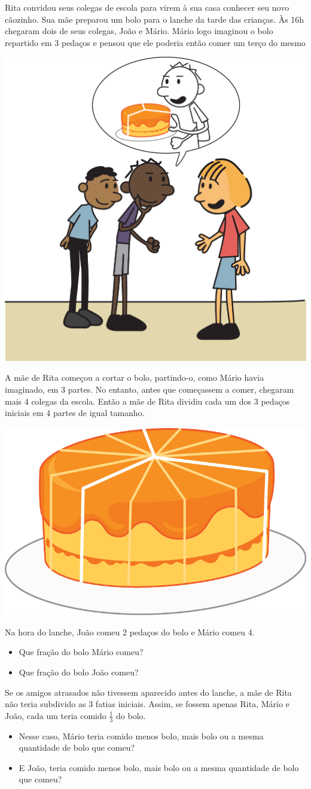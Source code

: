\documentclass[10 pt,usenames,dvipsnames, oneside]{article}
\begin{document}
Rita convidou seus colegas de escola para virem à sua casa conhecer seu novo cãozinho. Sua mãe preparou um bolo para o lanche da tarde das crianças. Às 16h chegaram dois de seus colegas, João e Mário. Mário logo imaginou o bolo repartido em 3 pedaços e pensou que ele poderia então comer um terço do mesmo

\begin{center}
\includegraphics[width=.5\textwidth, keepaspectratio]{ativ4_fig01.png}
\end{center}

A mãe de Rita começou a cortar o bolo, partindo-o, como Mário havia imaginado, em 3 partes. No entanto, antes que começassem a comer, chegaram mais 4 colegas da escola. Então a mãe de Rita dividiu cada um dos 3 pedaços iniciais em 4 partes de igual tamanho.

\begin{center}
\includegraphics[width=.25\textwidth, keepaspectratio]{ativ4_fig02.png}
\end{center}



Na hora do lanche, João comeu 2 pedaços do bolo e Mário comeu 4.
\begin{itemize} %
  \item     Que fração do bolo Mário comeu?
  \item     Que fração do bolo João comeu?
\end{itemize} %

Se os amigos atrasados não tivessem aparecido antes do lanche, a mãe de Rita não teria subdivido as 3 fatias iniciais. Assim, se fossem apenas Rita, Mário e João, cada um teria comido $\frac{1}{3}$ do bolo.
\begin{itemize} %
  \item     Nesse caso, Mário teria comido menos bolo, mais bolo ou a mesma quantidade de bolo que comeu?
  \item     E João, teria comido menos bolo, mais bolo ou a mesma quantidade de bolo que comeu?
\end{itemize} %
\end{document}

